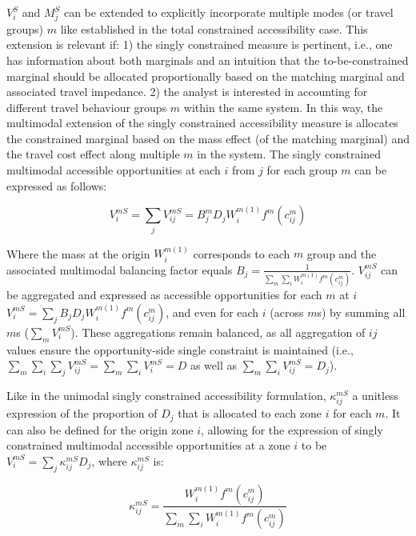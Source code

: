 \documentclass[
11pt, %
oneside, %
english, %
singlespacing, %
]{macthesis} %
\begin{document}
\(V^{S}_i\) and \(M^{S}_j\) can be extended to explicitly incorporate multiple modes (or travel groups) \(m\) like established in the total constrained accessibility case. This extension is relevant if: 1) the singly constrained measure is pertinent, i.e., one has information about both marginals and an intuition that the to-be-constrained marginal should be allocated proportionally based on the matching marginal and associated travel impedance. 2) the analyst is interested in accounting for different travel behaviour groups \(m\) within the same system. In this way, the multimodal extension of the singly constrained accessibility measure is allocates the constrained marginal based on the mass effect (of the matching marginal) and the travel cost effect along multiple \(m\) in the system. The singly constrained multimodal accessible opportunities at each \(i\) from \(j\) for each group \(m\) can be expressed as follows:

\begin{equation}
\label{eq:singly-constrained-multimodal-accessibility}
V^{mS}_{i} = \sum_j V^{mS}_{ij} = B_j^{m} D_j W_i^{m(1)} f^m(c^m_{ij})
\end{equation} 

Where the mass at the origin \(W_i^{m(1)}\) corresponds to each \(m\) group and the associated multimodal balancing factor equals \(B_j = \frac{1}{\sum_m\sum_i W_i^{m(1)} f^m(c^m_{ij})}\). \(V^{mS}_{ij}\) can be aggregated and expressed as accessible opportunities for each \(m\) at \(i\) \(V^{mS}_{i} = \sum_j B_j D_j W_i^{m(1)} f^m(c^m_{ij})\), and even for each \(i\) (across \(m\)s) by summing all \(m\)s (\(\sum_m V^{mS}_{i}\)). These aggregations remain balanced, as all aggregation of \(ij\) values ensure the opportunity-side single constraint is maintained (i.e., \(\sum_m\sum_i\sum_j V^{mS}_{ij} = \sum_m\sum_i V^{mS}_{i} = D\) as well as \(\sum_m \sum_i V^{mS}_{ij} =  D_j\)).

Like in the unimodal singly constrained accessibility formulation, \(\kappa_{ij}^{mS}\) a unitless expression of the proportion of \(D_j\) that is allocated to each zone \(i\) for each \(m\). It can also be defined for the origin zone \(i\), allowing for the expression of singly constrained multimodal accessible opportunities at a zone \(i\) to be \(V^{mS}_i = \sum_j \kappa_{ij}^{mS} D_j\), where \(\kappa_{ij}^{mS}\) is:

\begin{equation}
\label{eq:multimodal-opportunity-constrained-proportional-allocation-factor}
\kappa^{mS}_{ij} = \frac{W_i^{m(1)} f^m(c^m_{ij})}{\sum_m\sum_i W_i^{m(1)} f^m(c^m_{ij})}
\end{equation} 
\end{document}
